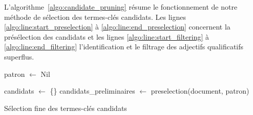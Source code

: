         L'algorithme~\ref{algo:candidate_pruning} résume le fonctionnement de
        notre méthode de sélection des termes-clés candidats. Les lignes
        \ref{algo:line:start_preselection} à \ref{algo:line:end_preselection}
        concernent la présélection des candidats et les lignes
        \ref{algo:line:start_filtering} à \ref{algo:line:end_filtering}
        l'identification et le filtrage des adjectifs qualificatifs superflus.
        \begin{algorithm}[t]
          \DontPrintSemicolon{}

          \BlankLine

          patron $\leftarrow$ Nil\;\label{algo:line:start_preselection}

          candidats $\leftarrow$ \{\}\;
          candidats\_preliminaires $\leftarrow$ preselection(document, patron)\;\label{algo:line:end_preselection}

          \label{algo:line:end_filtering}

          \caption{Sélection fine des termes-clés candidats
                   \label{algo:candidate_pruning}}
        \end{algorithm}

